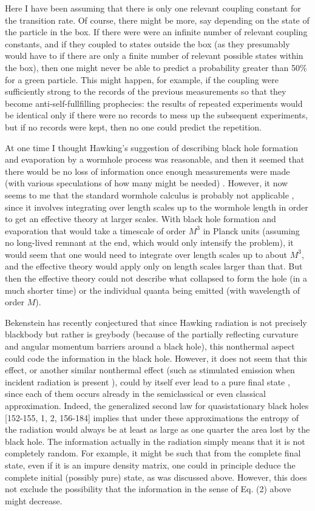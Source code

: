      Here I have been assuming that there is only one relevant
coupling
constant for the transition rate.  Of course, there might be more,
say
depending on the state of the particle in the box.  If there were
were an
infinite number of relevant coupling constants, and if they coupled
to states
outside the box (as they presumably would have to if there are only a
finite
number of relevant possible states within the box), then one might
never be
able to predict a probability greater than 50\% for a green particle.
This
might
happen, for example, if the coupling were sufficiently strong to the
records of
the previous measurements so that they become anti-self-fullfilling
prophecies:
 the results of repeated experiments would be identical only if there
were no
records to mess up the subsequent experiments, but if no records were
kept,
then no one could predict the repetition.

     At one time I thought Hawking's suggestion of describing black
hole
formation and evaporation by a wormhole process was reasonable, and
then it
seemed that there would be no loss of information once enough
measurements
were made (with various speculations of how many might be needed)
\cite{Pag92}.
 However, it now seems to me that the standard wormhole calculus is
probably
not applicable \cite{Pag93}, since it involves integrating over
length scales
up to the wormhole length in order to get an effective theory at
larger scales.
With black hole formation and evaporation that would take a timescale
of order $M^3$ in Planck units (assuming no long-lived remnant at the
end,
which would only intensify the problem), it
would seem that one would need to integrate over length scales up to
about
$M^3$, and the effective theory would apply only on length scales
larger than
that.  But then the effective theory could not describe what
collapsed to form
the hole (in a much shorter time) or the individual quanta being
emitted (with
wavelength of order $M$).

     Bekenstein has recently conjectured \cite{Bek93} that since
Hawking radiation is not precisely blackbody but rather is greybody
(because
of the partially reflecting curvature and angular momentum barriers
around
a black hole), this nonthermal aspect could code the
information in the black hole.  However, it does not seem that this
effect,
or another similar nonthermal effect (such as stimulated emission
when
incident radiation is present \cite{Schif93}),
could by itself ever lead to a pure final state \cite{DanSch,MulLou},
since each of them occurs already in the semiclassical
or even classical approximation.  Indeed, the
generalized second law for quasistationary black holes
[152-155, 1, 2, 156-184]
implies that under these approximations the entropy of the radiation
would
always be at least as large as one quarter the area lost by the black
hole.
The information actually in the radiation simply means that it is not
completely
random.  For example, it might be such that from the complete final
state,
even if it is an impure density matrix, one could in principle deduce
the
complete initial (possibly pure) state, as was discussed above.
However,
this does not exclude the possibility that the information in the
sense of Eq.
(2) above might decrease.


